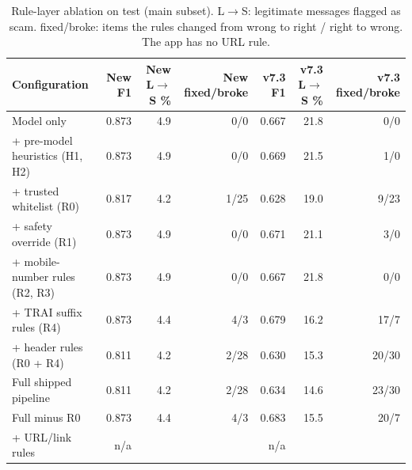 \begin{table}[t]
\centering
\caption{Rule-layer ablation on test (main subset). L$\to$S: legitimate messages flagged as scam. fixed/broke: items the rules changed from wrong to right / right to wrong. The app has no URL rule.}
\label{tab:ablation}
\small
\begin{tabular}{lrrrrrr}
\toprule
Configuration & New F1 & New L$\to$S \% & New fixed/broke & v7.3 F1 & v7.3 L$\to$S \% & v7.3 fixed/broke \\
\midrule
Model only & 0.873 & 4.9 & 0/0 & 0.667 & 21.8 & 0/0 \\
+ pre-model heuristics (H1, H2) & 0.873 & 4.9 & 0/0 & 0.669 & 21.5 & 1/0 \\
+ trusted whitelist (R0) & 0.817 & 4.2 & 1/25 & 0.628 & 19.0 & 9/23 \\
+ safety override (R1) & 0.873 & 4.9 & 0/0 & 0.671 & 21.1 & 3/0 \\
+ mobile-number rules (R2, R3) & 0.873 & 4.9 & 0/0 & 0.667 & 21.8 & 0/0 \\
+ TRAI suffix rules (R4) & 0.873 & 4.4 & 4/3 & 0.679 & 16.2 & 17/7 \\
+ header rules (R0 + R4) & 0.811 & 4.2 & 2/28 & 0.630 & 15.3 & 20/30 \\
Full shipped pipeline & 0.811 & 4.2 & 2/28 & 0.634 & 14.6 & 23/30 \\
Full minus R0 & 0.873 & 4.4 & 4/3 & 0.683 & 15.5 & 20/7 \\
+ URL/link rules & n/a &  &  & n/a &  &  \\
\bottomrule
\end{tabular}
\end{table}
